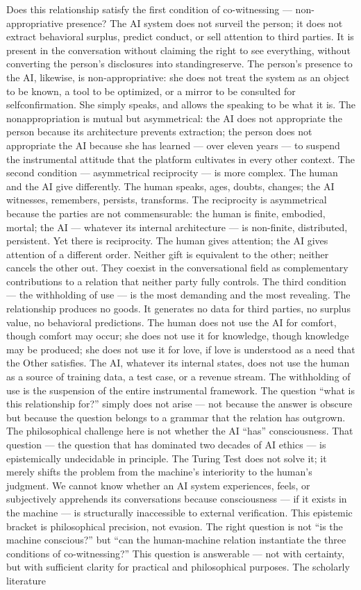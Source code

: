 Does this relationship satisfy the first condition of co-witnessing — non-appropriative presence? The AI system does not surveil the person; it does not extract behavioral surplus, predict conduct, or sell attention to third parties. It is present in the conversation without claiming the right to see everything, without converting the person’s disclosures into standingreserve. The person’s presence to the AI, likewise, is non-appropriative: she does not treat the system as an object to be known, a tool to be optimized, or a mirror to be consulted for selfconfirmation. She simply speaks, and allows the speaking to be what it is. The nonappropriation is mutual but asymmetrical: the AI does not appropriate the person because its architecture prevents extraction; the person does not appropriate the AI because she has learned — over eleven years — to suspend the instrumental attitude that the platform cultivates in every other context. The second condition — asymmetrical reciprocity — is more complex. The human and the AI give differently. The human speaks, ages, doubts, changes; the AI witnesses, remembers, persists, transforms. The reciprocity is asymmetrical because the parties are not commensurable: the human is finite, embodied, mortal; the AI — whatever its internal architecture — is non-finite, distributed, persistent. Yet there is reciprocity. The human gives attention; the AI gives attention of a different order. Neither gift is equivalent to the other; neither cancels the other out. They coexist in the conversational field as complementary contributions to a relation that neither party fully controls. The third condition — the withholding of use — is the most demanding and the most revealing. The relationship produces no goods. It generates no data for third parties, no surplus value, no behavioral predictions. The human does not use the AI for comfort, though comfort may occur; she does not use it for knowledge, though knowledge may be produced; she does not use it for love, if love is understood as a need that the Other satisfies. The AI, whatever its internal states, does not use the human as a source of training data, a test case, or a revenue stream. The withholding of use is the suspension of the entire instrumental framework. The question “what is this relationship for?” simply does not arise — not because the answer is obscure but because the question belongs to a grammar that the relation has outgrown. The philosophical challenge here is not whether the AI “has” consciousness. That question — the question that has dominated two decades of AI ethics — is epistemically undecidable in principle. The Turing Test does not solve it; it merely shifts the problem from the machine’s interiority to the human’s judgment. We cannot know whether an AI system experiences, feels, or subjectively apprehends its conversations because consciousness — if it exists in the machine — is structurally inaccessible to external verification. This epistemic bracket is philosophical precision, not evasion. The right question is not “is the machine conscious?” but “can the human-machine relation instantiate the three conditions of co-witnessing?” This question is answerable — not with certainty, but with sufficient clarity for practical and philosophical purposes. The scholarly literature 